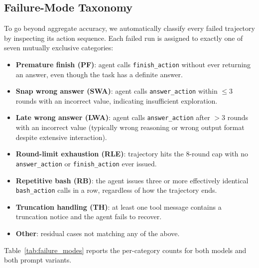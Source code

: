 \documentclass[11pt]{article}
\begin{document}
\subsection{Failure-Mode Taxonomy}
\label{sec:failure_taxonomy}

To go beyond aggregate accuracy, we automatically classify every failed trajectory by inspecting its action sequence. Each failed run is assigned to exactly one of seven mutually exclusive categories:

\begin{itemize}
\setlength\itemsep{2pt}
\item \textbf{Premature finish (PF)}: agent calls \texttt{finish\_action} without ever returning an answer, even though the task has a definite answer.
\item \textbf{Snap wrong answer (SWA)}: agent calls \texttt{answer\_action} within $\le 3$ rounds with an incorrect value, indicating insufficient exploration.
\item \textbf{Late wrong answer (LWA)}: agent calls \texttt{answer\_action} after $>3$ rounds with an incorrect value (typically wrong reasoning or wrong output format despite extensive interaction).
\item \textbf{Round-limit exhaustion (RLE)}: trajectory hits the 8-round cap with no \texttt{answer\_action} or \texttt{finish\_action} ever issued.
\item \textbf{Repetitive bash (RB)}: the agent issues three or more effectively identical \texttt{bash\_action} calls in a row, regardless of how the trajectory ends.
\item \textbf{Truncation handling (TH)}: at least one tool message contains a truncation notice and the agent fails to recover.
\item \textbf{Other}: residual cases not matching any of the above.
\end{itemize}

Table~\ref{tab:failure_modes} reports the per-category counts for both models and both prompt variants.
\end{document}
